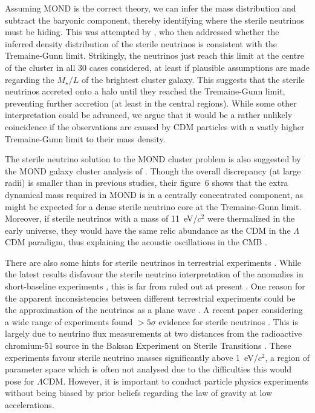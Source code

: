 \documentclass[fleqn,usenatbib,useAMS]{mnras} %
\begin{document}
Assuming MOND is the correct theory, we can infer the mass distribution and subtract the baryonic component, thereby identifying where the sterile neutrinos must be hiding. This was attempted by \citet{Angus_2010}, who then addressed whether the inferred density distribution of the sterile neutrinos is consistent with the Tremaine-Gunn limit. Strikingly, the neutrinos just reach this limit at the centre of the cluster in all 30 cases considered, at least if plausible assumptions are made regarding the $M_{\star}/L$ of the brightest cluster galaxy. This suggests that the sterile neutrinos accreted onto a halo until they reached the Tremaine-Gunn limit, preventing further accretion (at least in the central regions). While some other interpretation could be advanced, we argue that it would be a rather unlikely coincidence if the observations are caused by CDM particles with a vastly higher Tremaine-Gunn limit to their mass density.

The sterile neutrino solution to the MOND cluster problem is also suggested by the MOND galaxy cluster analysis of \citet{Ettori_2019}. Though the overall discrepancy (at large radii) is smaller than in previous studies, their figure~6 shows that the extra dynamical mass required in MOND is in a centrally concentrated component, as might be expected for a dense sterile neutrino core at the Tremaine-Gunn limit. Moreover, if sterile neutrinos with a mass of 11~eV/$c^2$ were thermalized in the early universe, they would have the same relic abundance as the CDM in the $\Lambda$CDM paradigm, thus explaining the acoustic oscillations in the CMB \citep[Section~\ref{nuHDM_early}; see also][]{Angus_2009, Haslbauer_2020}.

There are also some hints for sterile neutrinos in terrestrial experiments \citep[for a review, see][]{Giunti_2019}. While the latest results disfavour the sterile neutrino interpretation of the anomalies in short-baseline experiments \citep{Microboone_2022}, this is far from ruled out at present \citep{Arguelles_2022a}. One reason for the apparent inconsistencies between different terrestrial experiments could be the approximation of the neutrinos as a plane wave \citep{Arguelles_2022b}. A recent paper considering a wide range of experiments found $>5\sigma$ evidence for sterile neutrinos \citep{Berryman_2022}. This is largely due to neutrino flux measurements at two distances from the radioactive chromium-51 source in the Baksan Experiment on Sterile Transitions \citep[BEST;][]{Barinov_2022a, Barinov_2022b, Barinov_2022c}. These experiments favour sterile neutrino masses significantly above 1~eV/$c^2$, a region of parameter space which is often not analysed due to the difficulties this would pose for $\Lambda$CDM. However, it is important to conduct particle physics experiments without being biased by prior beliefs regarding the law of gravity at low accelerations.
\end{document}
